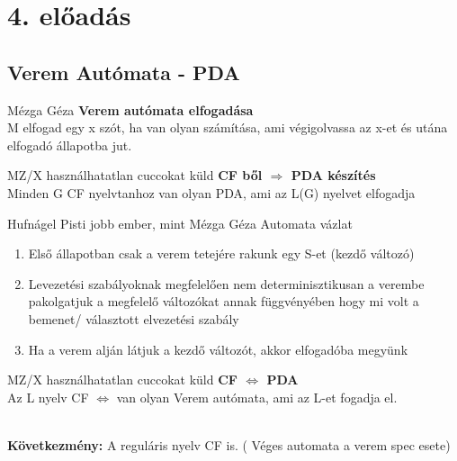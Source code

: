 \section{4. előadás}
\subsection{Verem Autómata - PDA}

\begin{definicio}{Mézga Géza}
  \textbf{Verem autómata elfogadása} \\[3pt]
	 M elfogad egy x szót, ha van olyan számítása, ami végigolvassa az x-et és utána elfogadó állapotba jut. \\[0pt]
\end{definicio}

	\begin{tetel}{MZ/X használhatatlan cuccokat küld}
   \textbf{CF ből $\Rightarrow$ PDA készítés} \\[3pt]
  Minden G CF nyelvtanhoz van olyan PDA, ami az L(G) nyelvet elfogadja\\[4pt]
  \end{tetel}

\begin{bizonyitas}{Hufnágel Pisti jobb ember, mint Mézga Géza}
 Automata vázlat

\begin{enumerate}[itemsep=1mm]
\item Első állapotban csak a verem tetejére rakunk egy S-et (kezdő változó)
\item Levezetési szabályoknak megfelelően nem determinisztikusan a verembe pakolgatjuk a megfelelő változókat annak függvényében hogy mi volt a bemenet/ választott elvezetési szabály
\item Ha a verem alján látjuk a kezdő változót, akkor elfogadóba megyünk
\end{enumerate}
\end{bizonyitas}

  	\begin{tetel}{MZ/X használhatatlan cuccokat küld}
    \textbf{CF $\Leftrightarrow$ PDA} \\[3pt]
  		Az L nyelv CF $\Leftrightarrow$ van olyan Verem autómata, ami az L-et fogadja el.
\end{tetel}

  		\notBiz \\[0pt]

	\textbf{Következmény:} A reguláris nyelv CF is. ( Véges automata a verem spec esete) \\[0pt]

